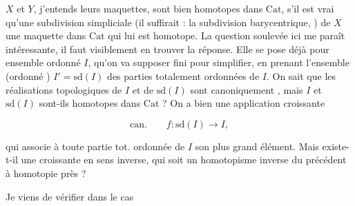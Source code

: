 $X$ et $Y$, j'entends leurs maquettes, sont bien homotopes dans $\mathrm{Cat}$, s'il est vrai qu'une subdivision simpliciale (il suffirait : la subdivision barycentrique, )  de $X$  une maquette dans $\mathrm{Cat}$ qui lui est homotope. La question soulevée ici me paraît intéressante, il faut visiblement en trouver la réponse. Elle se pose déjà pour  ensemble ordonné $I$, qu'on va supposer fini pour simplifier, en prenant l'ensemble (ordonné ) $I'=\mathrm{sd}(I)$ des parties totalement ordonnées de $I$. On sait que les réalisations topologiques de $I$ et de $\mathrm{sd}(I)$ sont canoniquement , mais $I$ et $\mathrm{sd}(I)$ sont-ils homotopes dans $\mathrm{Cat}$ ? On a bien une application croissante

\[
 \text{can.}\qquad f:\mathrm{sd}(I)\longrightarrow I,
\]

qui associe à toute partie tot. ordonnée de $I$ son plus grand élément. Mais existe-t-il une  croissante en sens inverse, qui soit un homotopisme inverse du précédent à homotopie près ?

 Je viens de vérifier dans le cas
